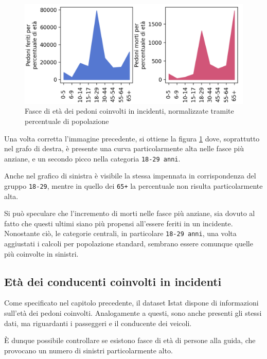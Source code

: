 \documentclass[a4paper,12pt]{report}
\newcommand{\columnstyle}[1]{\texttt{#1}}
\begin{document}
\begin{figure}
    \includegraphics[width=\linewidth]{../src/incidenti/incidenti_senza_coords/pedoni/eta_pedoni_norm.png}
    \caption{Fasce di età dei pedoni coinvolti in incidenti, normalizzate tramite percentuale di popolazione}
    \label{fig:eta-pedoni-norm}
\end{figure}

Una volta corretta l'immagine precedente, si ottiene la figura \ref{fig:eta-pedoni-norm} 
dove, soprattutto nel grafo di destra, è presente una curva particolarmente alta 
nelle fasce più anziane, e un secondo picco nella categoria \columnstyle{18-29 anni}. 

Anche nel grafico di sinistra è visibile la stessa impennata in corrispondenza 
del gruppo \columnstyle{18-29}, mentre in quello dei \columnstyle{65+} la 
percentuale non risulta particolarmente alta. 

Si può speculare che l'incremento di morti nelle fasce più anziane, sia dovuto al 
fatto che questi ultimi siano più propensi all'essere feriti in un incidente. 
Nonostante ciò, le categorie centrali, in particolare \columnstyle{18-29 anni}, 
una volta aggiustati i calcoli per popolazione standard, sembrano essere comunque 
quelle più coinvolte in sinistri. 

\subsection{Età dei conducenti coinvolti in incidenti}

Come specificato nel capitolo precedente, il dataset Istat dispone di 
informazioni sull'età dei pedoni coinvolti. Analogamente a questi, 
sono anche presenti gli stessi dati, ma riguardanti i passeggeri e il conducente dei 
veicoli. 

\`E dunque possibile controllare se esistono fasce di età di persone alla guida, 
che provocano un numero di sinistri particolarmente alto. 
\end{document}
